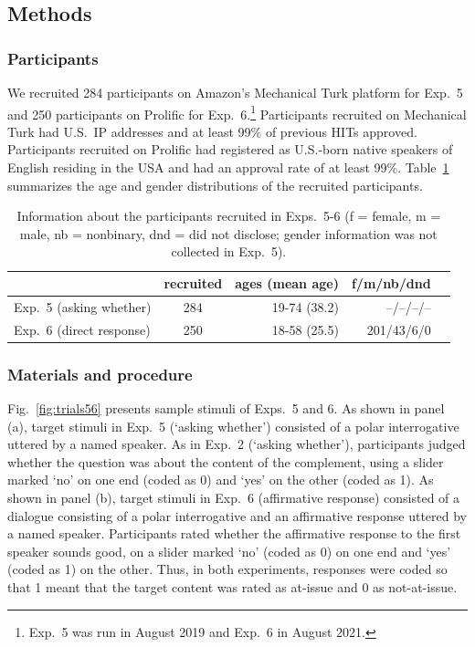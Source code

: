 \documentclass[times,linguex]{glossa}
\begin{document}
\subsection{Methods}

\subsubsection{Participants}

We recruited 284 participants on Amazon's Mechanical Turk platform for Exp.~5 and 250 participants on Prolific for Exp.~6.\footnote{Exp.~5 was run in August 2019 and Exp.~6 in August 2021.} Participants recruited on Mechanical Turk had U.S.\ IP addresses and at least 99\% of previous HITs approved. Participants recruited on Prolific had registered as U.S.-born native speakers of English residing in the USA and had an approval rate of at least 99\%. Table~\ref{t:recruited2} summarizes the age and gender distributions of the recruited participants.

\begin{table}[h!]
  \centering
  \begin{tabular}{l | c | r r r }
    & recruited & ages (mean age) & f/m/nb/dnd \\ \hline
    Exp.~5 (asking whether) & 284 & 19-74 (38.2) & --/--/--/--  \\
    Exp.~6 (direct response) & 250 & 18-58 (25.5)  & 201/43/6/0  \\
    \hline
  \end{tabular}
  
  \caption{Information about the participants recruited in Exps.~5-6 (f = female, m = male, nb = nonbinary, dnd = did not disclose; gender information was not collected in Exp.~5).}\label{t:recruited2}
\end{table}

\subsubsection{Materials and procedure}

Fig.~\ref{fig:trials56} presents sample stimuli of Exps.~5 and 6. As shown in panel (a), target stimuli in Exp.~5 (`asking whether') consisted of a polar interrogative uttered by a named speaker. As in Exp.~2 (`asking whether'), participants judged whether the question was about the content of the complement, using a slider marked `no' on one end (coded as 0) and `yes' on the other (coded as 1). As shown in panel (b), target stimuli in Exp.~6 (affirmative response) consisted of a dialogue consisting of a polar interrogative and an affirmative response uttered by a named speaker. Participants rated whether the affirmative response to the first speaker sounds good, on a slider marked `no' (coded as 0) on one end and `yes' (coded as 1) on the other. Thus, in both experiments, responses were coded so that 1 meant that the target content was rated as at-issue and 0 as not-at-issue.
\end{document}
